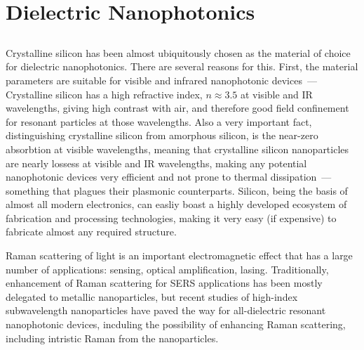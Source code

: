 \section{Dielectric Nanophotonics}
\label{ch:Intro}

    \subsection{}
            Crystalline silicon has been almost ubiquitously chosen as the material of choice for dielectric nanophotonics.
        There are several reasons for this. First, the material parameters are suitable for visible and infrared nanophotonic devices~---
        Crystalline silicon has a high refractive index, $n \approx 3.5$ at visible and IR wavelengths\cite{li1980refractive}, giving high contrast
        with air, and therefore good field confinement for resonant particles at those wavelengths\cite{mie1908beitrage, dmitriev2016resonant}. Also
        a very important fact, distinguishing crystalline silicon from amorphous silicon, is the near-zero absorbtion at visible wavelengths, meaning
        that crystalline silicon nanoparticles are nearly lossess at visible and IR wavelengths, making any potential nanophotonic devices very
        efficient and not prone to thermal dissipation~--- something that plagues their plasmonic counterparts.
            Silicon, being the basis of almost all modern electronics, can easliy boast a highly developed ecosystem of fabrication and processing
        technologies, making it very easy (if expensive) to fabricate almost any required structure.

             Raman scattering of light is an important electromagnetic effect\cite{hayes2012scattering} that has a large number of applications:
        sensing\cite{moskovits1985surface}, optical amplification\cite{islam2004wideband}, lasing\cite{pask2003design}.
        Traditionally, enhancement of Raman scattering for SERS applications has been mostly delegated to metallic nanoparticles, but
        recent studies of high-index subwavelength nanoparticles have paved the way for all-dielectric resonant nanophotonic devices, incduling
        the possibility of enhancing Raman scattering, including intristic Raman from the nanoparticles.

